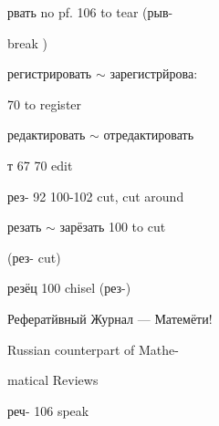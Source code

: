 \begin{minipage}[t]{0.475\textwidth}
\noindent рвать no pf. 106 to tear (рыв-\par
\noindent break )\par
\noindent регистрировать $\sim$ зарегистрйрова:\par
{} 70 to register\par
\noindent редактировать $\sim$ отредактировать\par
\noindent т 67 70 edit\par
\noindent рез- 92 100-102 cut, cut around\par
\noindent резать $\sim$ зарёзать 100 to cut\par
\noindent (рез- cut)\par
\noindent резёц 100 chisel (рез-)\par
\noindent Рефератйвный Журнал — Матемёти!\par
{} Russian counterpart of Mathe-\par
\noindent matical Reviews\par
\noindent реч- 106 speak\par
\end{minipage}
\endgroup

